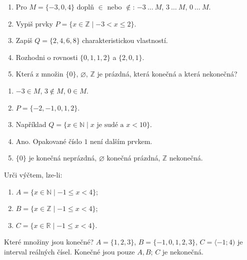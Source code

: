 \documentclass[11pt,a4paper]{article}
\begin{document}
\begin{zadaniReseniBox}[title={Samostatná práce 1}]
\begin{enumerate}[label=\alph*)]
\item Pro $M=\{-3,0,4\}$ doplň $\in$ nebo $\notin$:
$-3\ \ldots\ M$, $3\ \ldots\ M$, $0\ \ldots\ M$.
\item Vypiš prvky $P=\{x\in\mathbb Z\mid -3<x\le2\}$.
\item Zapiš $Q=\{2,4,6,8\}$ charakteristickou vlastností.
\item Rozhodni o rovnosti $\{0,1,1,2\}$ a $\{2,0,1\}$.
\item Která z množin $\{0\}$, $\varnothing$, $\mathbb Z$ je prázdná,
která konečná a která nekonečná?
\end{enumerate}
\tcblower
\begin{enumerate}[label=\alph*)]
\item $-3\in M$, $3\notin M$, $0\in M$.
\item $P=\{-2,-1,0,1,2\}$.
\item Například $Q=\{x\in\mathbb N\mid x\text{ je sudé a }x<10\}$.
\item Ano. Opakované číslo $1$ není dalším prvkem.
\item $\{0\}$ je konečná neprázdná, $\varnothing$ konečná prázdná,
$\mathbb Z$ nekonečná.
\end{enumerate}
\end{zadaniReseniBox}

\begin{zadaniReseniBox}[title={Rozšíření 1}]
Urči výčtem, lze-li:
\begin{enumerate}[label=\alph*)]
\item $A=\{x\in\mathbb N\mid -1\le x<4\}$;
\item $B=\{x\in\mathbb Z\mid -1\le x<4\}$;
\item $C=\{x\in\mathbb R\mid -1\le x<4\}$.
\end{enumerate}
Které množiny jsou konečné?
\tcblower
$A=\{1,2,3\}$, $B=\{-1,0,1,2,3\}$,
$C=\langle-1;4)$ je interval reálných čísel.
Konečné jsou pouze $A,B$; $C$ je nekonečná.
\end{zadaniReseniBox}
\end{document}
